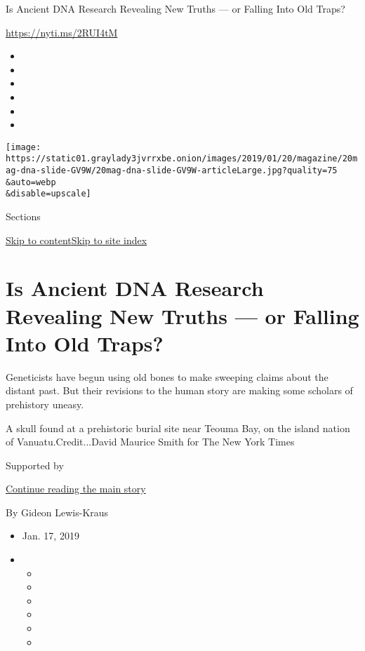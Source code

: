 Is Ancient DNA Research Revealing New Truths --- or Falling Into Old
Traps?

\url{https://nyti.ms/2RUI4tM}

\begin{itemize}
\item
\item
\item
\item
\item
\item
\end{itemize}

\texttt{[image: https://static01.graylady3jvrrxbe.onion/images/2019/01/20/magazine/20mag-dna-slide-GV9W/20mag-dna-slide-GV9W-articleLarge.jpg?quality=75\\\&auto=webp\\\&disable=upscale]}

Sections

\protect\hyperlink{site-content}{Skip to
content}\protect\hyperlink{site-index}{Skip to site index}

\hypertarget{is-ancient-dna-research-revealing-new-truths--or-falling-into-old-traps}{%
\section{Is Ancient DNA Research Revealing New Truths --- or Falling
Into Old
Traps?}\label{is-ancient-dna-research-revealing-new-truths--or-falling-into-old-traps}}

Geneticists have begun using old bones to make sweeping claims about the
distant past. But their revisions to the human story are making some
scholars of prehistory uneasy.

A skull found at a prehistoric burial site near Teouma Bay, on the
island nation of Vanuatu.Credit...David Maurice Smith for The New York
Times

Supported by

\protect\hyperlink{after-sponsor}{Continue reading the main story}

By Gideon Lewis-Kraus

\begin{itemize}
\item
  Jan. 17, 2019
\item
  \begin{itemize}
  \item
  \item
  \item
  \item
  \item
  \item
  \end{itemize}
\end{itemize}

